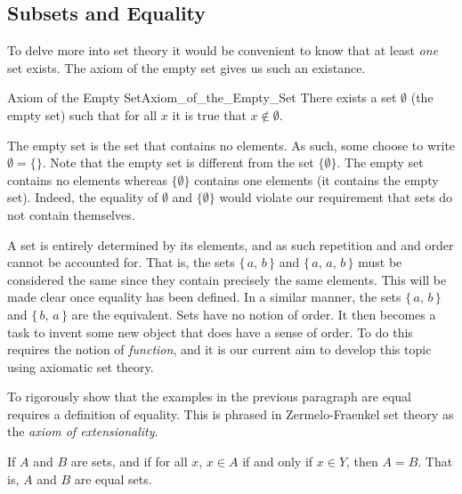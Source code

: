         \subsection{Subsets and Equality}
            To delve more into set theory it would be convenient to know that
            at least \textit{one} set exists. The axiom of the empty set gives
            us such an existance.
            \begin{faxiom}{Axiom of the Empty Set}{Axiom_of_the_Empty_Set}
                There exists a set $\emptyset$ (the empty set) such
                that for all $x$ it is true that $x\notin\emptyset$.
            \end{faxiom}
            The empty set is the set that contains no elements. As such, some
            choose to write $\emptyset=\{\}$. Note that the empty set is
            different from the set $\{\emptyset\}$. The empty set contains no
            elements whereas $\{\emptyset\}$ contains one elements (it
            contains the empty set). Indeed, the equality of $\emptyset$ and
            $\{\emptyset\}$ would violate our requirement that sets do not
            contain themselves.
            \par\hfill\par
            A set is entirely determined by its elements, and as such
            repetition and and order cannot be accounted for. That is, the
            sets $\{\,a,\,b\,\}$ and $\{\,a,\,a,\,b\,\}$ must be considered
            the same since they contain precisely the same elements. This will
            be made clear once equality has been defined. In a similar manner,
            the sets $\{\,a,\,b\,\}$ and $\{\,b,\,a\,\}$ are the equivalent.
            Sets have no notion of order. It then becomes a task to invent
            some new object that does have a sense of order. To do this
            requires the notion of \textit{function}, and it is our current aim
            to develop this topic using axiomatic set theory.
            \par\hfill\par
            To rigorously show that the examples in the previous paragraph are
            equal requires a definition of equality. This is phrased in
            Zermelo-Fraenkel set theory as the \textit{axiom of extensionality}.
            \begin{axiom}
                If $A$ and $B$ are sets, and if for all $x$, $x\in{A}$
                if and only if $x\in{Y}$, then $A=B$. That is,
                $A$ and $B$ are equal sets.
            \end{axiom}
